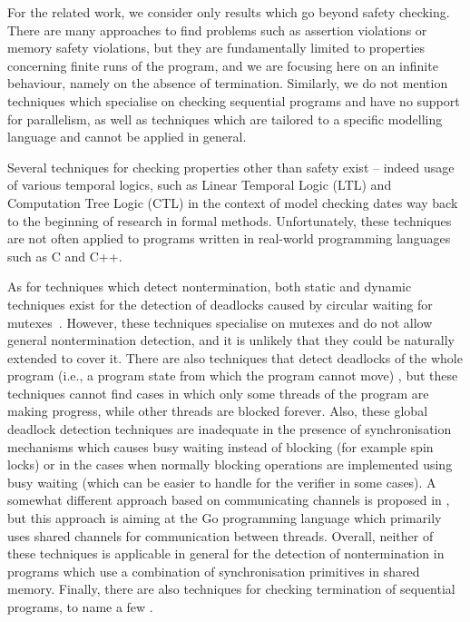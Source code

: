 For the related work, we consider only results which go beyond safety checking.
There are many approaches to find problems such as assertion violations or memory safety violations, but they are fundamentally limited to properties concerning finite runs of the program, and we are focusing here on an infinite behaviour, namely on the absence of termination.
Similarly, we do not mention techniques which specialise on checking sequential programs and have no support for parallelism, as well as techniques which are tailored to a specific modelling language and cannot be applied in general.

Several techniques for checking properties other than safety exist -- indeed
usage of various temporal logics, such as Linear Temporal Logic (LTL)
\cite[Chapter 5]{PoMC} and Computation Tree Logic (CTL) \cite[Chapter 6]{PoMC} in the context of model checking dates way back to the beginning of research in formal methods.
Unfortunately, these techniques are not often applied to programs written in real-world programming languages such as C and C++.

As for techniques which detect nontermination, both static and dynamic
techniques exist for the detection of deadlocks caused by circular waiting for
mutexes~\cite{CC14,agarwal2010detection,bensalem2005scalable}.
However, these techniques specialise on mutexes and do not allow general nontermination detection, and it is unlikely that they could be naturally extended to cover it.
There are also techniques that detect deadlocks of the whole program (i.e., a program state from which the program cannot move) \cite{Chaki2005,Demartini99}, but these techniques cannot find cases in which only some threads of the program are making progress, while other threads are blocked forever.
Also, these global deadlock detection techniques are inadequate in the presence of synchronisation mechanisms which causes busy waiting instead of blocking (for example spin locks) or in the cases when normally blocking operations are implemented using busy waiting (which can be easier to handle for the verifier in some cases).
A somewhat different approach based on communicating channels is proposed in \cite{Ng2016}, but this approach is aiming at the Go programming language which primarily uses shared channels for communication between threads.
Overall, neither of these techniques is applicable in general for the detection of nontermination in programs which use a combination of synchronisation primitives in shared memory.
Finally, there are also techniques for checking termination of sequential programs, to name a few \cite{Giesl2017,Chen2018}.

